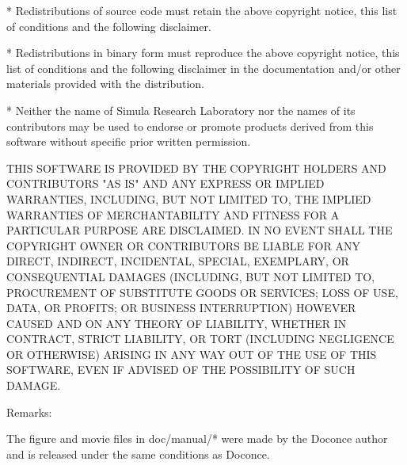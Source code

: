 \documentclass[%
oneside,                 %
final,                   %
chapterprefix=true,      %
open=right,              %
10pt]{book}
\begin{document}
    * Redistributions of source code must retain the above copyright
      notice, this list of conditions and the following disclaimer.

    * Redistributions in binary form must reproduce the above copyright
      notice, this list of conditions and the following disclaimer in
      the documentation and/or other materials provided with the
      distribution.

    * Neither the name of Simula Research Laboratory nor the names of
      its contributors may be used to endorse or promote products
      derived from this software without specific prior written
      permission.

THIS SOFTWARE IS PROVIDED BY THE COPYRIGHT HOLDERS AND CONTRIBUTORS
"AS IS" AND ANY EXPRESS OR IMPLIED WARRANTIES, INCLUDING, BUT NOT
LIMITED TO, THE IMPLIED WARRANTIES OF MERCHANTABILITY AND FITNESS FOR
A PARTICULAR PURPOSE ARE DISCLAIMED. IN NO EVENT SHALL THE COPYRIGHT
OWNER OR CONTRIBUTORS BE LIABLE FOR ANY DIRECT, INDIRECT, INCIDENTAL,
SPECIAL, EXEMPLARY, OR CONSEQUENTIAL DAMAGES (INCLUDING, BUT NOT LIMITED
TO, PROCUREMENT OF SUBSTITUTE GOODS OR SERVICES; LOSS OF USE, DATA, OR
PROFITS; OR BUSINESS INTERRUPTION) HOWEVER CAUSED AND ON ANY THEORY OF
LIABILITY, WHETHER IN CONTRACT, STRICT LIABILITY, OR TORT (INCLUDING
NEGLIGENCE OR OTHERWISE) ARISING IN ANY WAY OUT OF THE USE OF THIS
SOFTWARE, EVEN IF ADVISED OF THE POSSIBILITY OF SUCH DAMAGE.

Remarks:

The figure and movie files in doc/manual/* were made by the Doconce
author and is released under the same conditions as Doconce.


\epy


\end{document}
